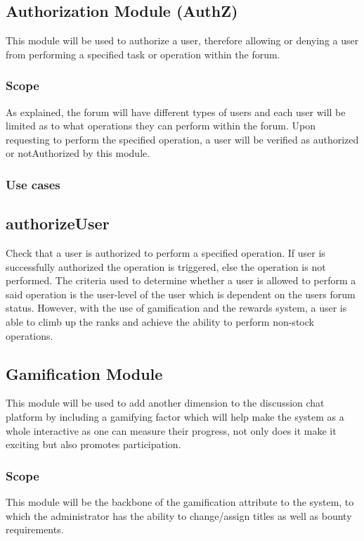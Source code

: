 \documentclass[12pt]{article}
\begin{document}


\newpage
\subsection{Authorization Module (AuthZ)}
\par{This module will be used to authorize a user, therefore allowing or denying a user from performing a specified task or operation within the forum.
}

\subsubsection{Scope}
\par{As explained, the forum will have different types of users and each user will be limited as to what operations they can perform within the forum. Upon requesting to perform the specified operation, a user will be verified as authorized or notAuthorized by this module. }

\subsubsection{Use cases}
\subsection*{authorizeUser}
\par{Check that a user is authorized to perform a specified operation. If user is successfully authorized the operation is triggered, else the operation is not performed. The criteria used to determine whether a user is allowed to perform a said operation is the user-level of the user which is dependent on the users forum status. However, with the use of gamification and the rewards system, a user is able to climb up the ranks and achieve the ability to perform non-stock operations.} 

\subsection{Gamification Module}
\par{This module will be used to add another dimension to the discussion chat platform by including a gamifying factor which will help make the system as a whole interactive as one can measure their progress, not only does it make it exciting but also promotes participation.}
\subsubsection{Scope}
\par{This module will be the backbone of the gamification attribute to the system, to which the administrator has the ability to change/assign titles as well as bounty requirements.}
\end{document}
